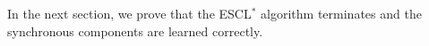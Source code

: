 	In the next section, we prove that the ESCL$^*$ algorithm terminates and the synchronous components are learned correctly.
